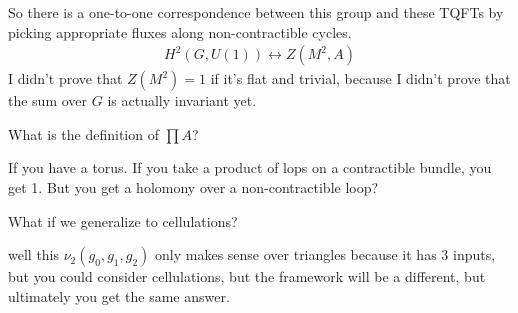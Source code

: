 So there is a one-to-one correspondence between this group and these TQFTs by
picking appropriate fluxes along non-contractible cycles.
\begin{align}
    H^2(G, U(1)) \leftrightarrow Z(M^2, A)
\end{align}
I didn't prove that $Z(M^2)=1$ if it's flat and trivial,
because I didn't prove that the sum over $G$ is actually invariant yet.

\begin{question}
    What is the definition of $\prod A$?
\end{question}
If you have a torus.
If you take a product of lops on a contractible bundle,
you get 1.
But you get a holomony over a non-contractible loop?

\begin{question}
    What if we generalize to cellulations?
\end{question}
well this $\nu_2(g_0, g_1, g_2)$ only makes sense over triangles because it has
3 inputs,
but you could consider cellulations,
but the framework will be a different,
but ultimately you get the same answer.
